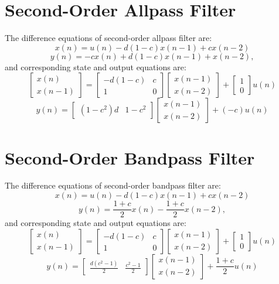 \documentclass[10pt,a4paper,oneside]{article}
\begin{document}
\section{Second-Order Allpass Filter}
The difference equations of second-order allpass filter are: 
\[
x(n) = u(n) - d(1-c)x(n-1) + cx(n-2)
\]
\[
y(n) = -cx(n) + d(1-c)x(n-1) + x(n-2),
\]
and corresponding state and output equations are:
\[
\begin{bmatrix}x(n)\\x(n-1)\end{bmatrix} = \begin{bmatrix}
-d(1-c)&c\\
1&0
\end{bmatrix}
\begin{bmatrix}x(n-1)\\x(n-2)\end{bmatrix} + \begin{bmatrix}1\\0\end{bmatrix}
u(n)\]
\[
y(n) = \begin{bmatrix}(1-c^2)d&1-c^2\end{bmatrix}
\begin{bmatrix}x(n-1)\\x(n-2)\end{bmatrix} + (-c)u(n)
\]
\section{Second-Order Bandpass Filter}
The difference equations of second-order bandpass filter are: 
\[
x(n) = u(n) - d(1-c)x(n-1) + cx(n-2)
\]
\[
y(n) = \frac{1+c}{2}x(n) - \frac{1+c}{2}x(n-2),
\]
and corresponding state and output equations are:
\[
\begin{bmatrix}x(n)\\x(n-1)\end{bmatrix} = \begin{bmatrix}
-d(1-c)&c\\
1&0
\end{bmatrix}
\begin{bmatrix}x(n-1)\\x(n-2)\end{bmatrix} + \begin{bmatrix}1\\0\end{bmatrix}
u(n)\]
\[
y(n) = \begin{bmatrix}\frac{d(c^2-1)}{2}&\frac{c^2-1}{2}\end{bmatrix}
\begin{bmatrix}x(n-1)\\x(n-2)\end{bmatrix} + \frac{1+c}{2}u(n)
\]
\end{document}
